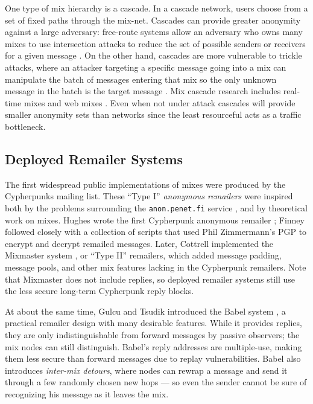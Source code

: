 \documentclass[11pt]{IEEEtran}
\begin{document}
One type of mix hierarchy is a cascade.
In a cascade network, users choose from a set of fixed paths through
the mix-net.
Cascades can provide greater anonymity against a large adversary:
free-route systems allow an adversary who owns many mixes to use
intersection attacks to reduce the set of possible senders or receivers
for a given
message \cite{disad-free-routes}. On the other hand, cascades are more
vulnerable \cite{batching-taxonomy} to trickle attacks, where an attacker
targeting a specific message going into a mix can manipulate the batch
of messages entering that mix so the only unknown message in the batch
is the target message \cite{mixmaster-attacks}\cite{babel}.
Mix cascade research includes real-time mixes \cite{realtime-mix} and
web mixes \cite{web-mix}. Even when not under attack cascades will
provide smaller anonymity sets than networks since the least
resourceful acts as a traffic bottleneck.

\subsection{Deployed Remailer Systems}

The first widespread public implementations of mixes were produced by the
Cypherpunks mailing list. These ``Type I'' \emph{anonymous remailers}
were inspired both by the problems surrounding the {\tt anon.penet.fi}
service \cite{helsingius}, and by theoretical work on mixes. Hughes wrote
the first Cypherpunk anonymous remailer \cite{remailer-history}; Finney
followed closely with a collection of scripts that used Phil Zimmermann's
PGP to encrypt and decrypt remailed messages. Later, Cottrell implemented
the Mixmaster system \cite{mixmaster}\cite{mixmaster-spec}, or ``Type II'' remailers,
which added message padding, message pools, and other mix features lacking
in the Cypherpunk remailers. Note that Mixmaster does not include replies,
so deployed remailer systems still use the less secure
long-term Cypherpunk reply blocks.

At about the same time, Gulcu and Tsudik introduced the Babel
system \cite{babel}, a practical remailer design with many desirable
features. While it provides replies, they are only indistinguishable
from forward messages by passive observers; the mix nodes can still
distinguish. Babel's reply addresses are multiple-use, making them less
secure than forward messages due to replay vulnerabilities. Babel also
introduces \emph{inter-mix detours}, where nodes can rewrap a message
and send it through a few randomly chosen new hops --- so even the sender
cannot be sure of recognizing his message as it leaves the mix.
\end{document}

